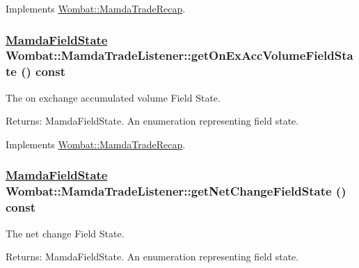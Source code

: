 Implements \hyperlink{classWombat_1_1MamdaTradeRecap_84fad7757aecfad7c39e563709091c46}{Wombat::Mamda\-Trade\-Recap}.\hypertarget{classWombat_1_1MamdaTradeListener_ce848079dc4e2282b59ca502f891e436}{
\subsubsection[getOnExAccVolumeFieldState]{\setlength{\rightskip}{0pt plus 5cm}\hyperlink{namespaceWombat_93aac974f2ab713554fd12a1fa3b7d2a}{Mamda\-Field\-State} Wombat::Mamda\-Trade\-Listener::get\-On\-Ex\-Acc\-Volume\-Field\-State () const}}
\label{classWombat_1_1MamdaTradeListener_ce848079dc4e2282b59ca502f891e436}


The on exchange accumulated volume Field State. 

\begin{Desc}
\item[Returns:]Mamda\-Field\-State. An enumeration representing field state. \end{Desc}


Implements \hyperlink{classWombat_1_1MamdaTradeRecap_da9986c1440a9f58b1c3c477b4367bbe}{Wombat::Mamda\-Trade\-Recap}.\hypertarget{classWombat_1_1MamdaTradeListener_b147b82694481c48a976dce74b2b0241}{
\subsubsection[getNetChangeFieldState]{\setlength{\rightskip}{0pt plus 5cm}\hyperlink{namespaceWombat_93aac974f2ab713554fd12a1fa3b7d2a}{Mamda\-Field\-State} Wombat::Mamda\-Trade\-Listener::get\-Net\-Change\-Field\-State () const}}
\label{classWombat_1_1MamdaTradeListener_b147b82694481c48a976dce74b2b0241}


The net change Field State. 

\begin{Desc}
\item[Returns:]Mamda\-Field\-State. An enumeration representing field state. \end{Desc}


